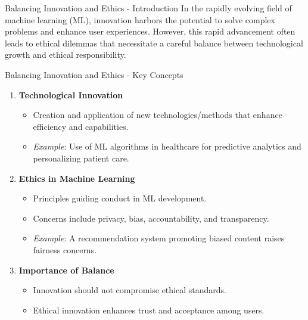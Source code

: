 \documentclass[aspectratio=169]{beamer}
\begin{document}
\begin{frame}[fragile]{Balancing Innovation and Ethics - Introduction}
    In the rapidly evolving field of machine learning (ML), innovation harbors the potential to solve complex problems and enhance user experiences. 
    However, this rapid advancement often leads to ethical dilemmas that necessitate a careful balance between technological growth and ethical responsibility.
\end{frame}

\begin{frame}[fragile]{Balancing Innovation and Ethics - Key Concepts}
    \begin{enumerate}
        \item \textbf{Technological Innovation}
        \begin{itemize}
            \item Creation and application of new technologies/methods that enhance efficiency and capabilities.
            \item \textit{Example}: Use of ML algorithms in healthcare for predictive analytics and personalizing patient care.
        \end{itemize}
        
        \item \textbf{Ethics in Machine Learning}
        \begin{itemize}
            \item Principles guiding conduct in ML development.
            \item Concerns include privacy, bias, accountability, and transparency.
            \item \textit{Example}: A recommendation system promoting biased content raises fairness concerns.
        \end{itemize}
        
        \item \textbf{Importance of Balance}
        \begin{itemize}
            \item Innovation should not compromise ethical standards.
            \item Ethical innovation enhances trust and acceptance among users.
        \end{itemize}
    \end{enumerate}
\end{frame}
\end{document}
